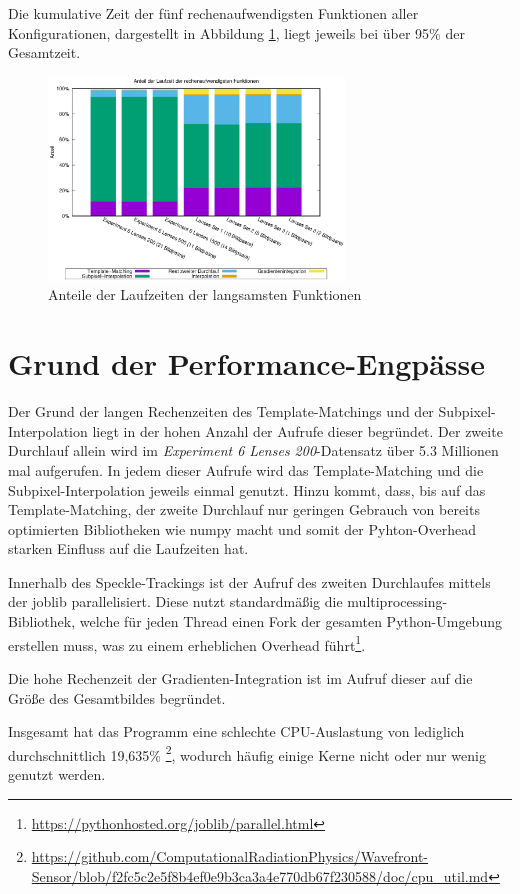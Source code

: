 Die kumulative Zeit der fünf rechenaufwendigsten Funktionen aller Konfigurationen, dargestellt in Abbildung \ref{fig:perc_slow}, liegt jeweils bei über 95\% der Gesamtzeit. 

\begin{center}
	\begin{figure}[htbp]
		\centering
		\includegraphics[width=0.7\textwidth]{pdf/slow}
		\caption{Anteile der Laufzeiten der langsamsten Funktionen}
		\label{fig:perc_slow}
	\end{figure}
\end{center}

\section{Grund der Performance-Engpässe}

Der Grund der langen Rechenzeiten des Template-Matchings und der Subpixel-Interpolation liegt in der hohen Anzahl der Aufrufe dieser begründet. Der zweite Durchlauf allein wird im \textit{Experiment 6 Lenses 200}-Datensatz über 5.3 Millionen mal aufgerufen. In jedem dieser Aufrufe wird das Template-Matching und die Subpixel-Interpolation jeweils einmal genutzt. Hinzu kommt, dass, bis auf das Temp\-late-Match\-ing, der zweite Durchlauf nur geringen Gebrauch von bereits optimierten Bibliotheken wie numpy macht und somit der Pyhton-Overhead starken Einfluss auf die Laufzeiten hat. 

Innerhalb des Speckle-Trackings ist der Aufruf des zweiten Durchlaufes mittels der joblib parallelisiert. Diese nutzt standardmäßig die multiprocessing-Bibliothek, welche für jeden Thread einen Fork der gesamten Python-Umgebung erstellen muss, was zu einem erheblichen Overhead führt\footnote{\url{https://pythonhosted.org/joblib/parallel.html}}.

Die hohe Rechenzeit der Gradienten-Integration ist im Aufruf dieser auf die Größe des Gesamtbildes begründet.

Insgesamt hat das Programm eine schlechte CPU-Auslastung von lediglich durchschnittlich 19,635\% \footnote{\url{https://github.com/ComputationalRadiationPhysics/Wavefront-Sensor/blob/f2fc5c2e5f8b4ef0e9b3ca3a4e770db67f230588/doc/cpu_util.md}}, wodurch häufig einige Kerne nicht oder nur wenig genutzt werden. 